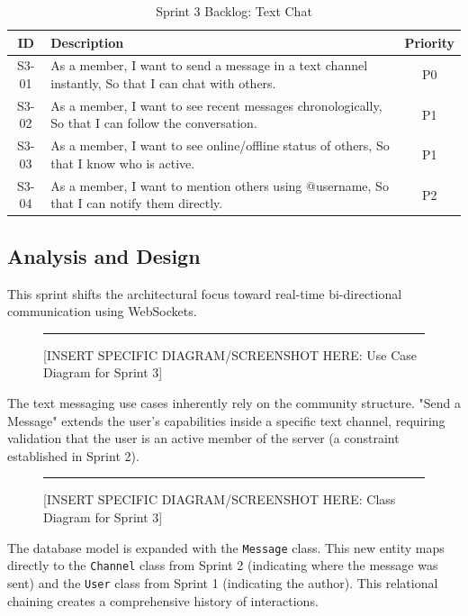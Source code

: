\begin{table}[h!]
    \centering
    \begin{tabular}{|c|p{10cm}|c|}
        \hline
        \textbf{ID} & \textbf{Description} & \textbf{Priority} \\
        \hline
        S3-01 & As a member, I want to send a message in a text channel instantly, So that I can chat with others. & P0 \\
        \hline
        S3-02 & As a member, I want to see recent messages chronologically, So that I can follow the conversation. & P1 \\
        \hline
        S3-03 & As a member, I want to see online/offline status of others, So that I know who is active. & P1 \\
        \hline
        S3-04 & As a member, I want to mention others using @username, So that I can notify them directly. & P2 \\
        \hline
    \end{tabular}
    \caption{Sprint 3 Backlog: Text Chat}
    \label{tab:sprint3_backlog}
\end{table}

\subsection{Analysis and Design}
This sprint shifts the architectural focus toward real-time bi-directional communication using WebSockets.

\begin{figure}[h!]
    \centering
    \rule{0.8\textwidth}{5cm} %
    \caption{[INSERT SPECIFIC DIAGRAM/SCREENSHOT HERE: Use Case Diagram for Sprint 3]}
    \label{fig:sprint3_usecase}
\end{figure}

The text messaging use cases inherently rely on the community structure. "Send a Message" extends the user's capabilities inside a specific text channel, requiring validation that the user is an active member of the server (a constraint established in Sprint 2).

\begin{figure}[h!]
    \centering
    \rule{0.8\textwidth}{5cm} %
    \caption{[INSERT SPECIFIC DIAGRAM/SCREENSHOT HERE: Class Diagram for Sprint 3]}
    \label{fig:sprint3_class}
\end{figure}

The database model is expanded with the \texttt{Message} class. This new entity maps directly to the \texttt{Channel} class from Sprint 2 (indicating where the message was sent) and the \texttt{User} class from Sprint 1 (indicating the author). This relational chaining creates a comprehensive history of interactions.

